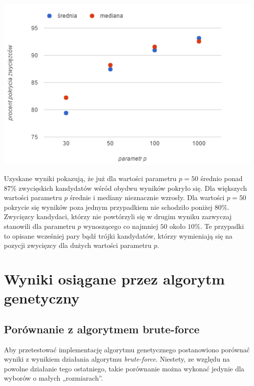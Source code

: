 \documentclass[pdflatex,11pt]{../aghdoc_version2}
\begin{document}
\vspace{\baselineskip}

\begin{center}
\centerline{\includegraphics[scale=1]{pics/srednia_mediana_od_parametr_p.png}}
\end{center}

Uzyskane wyniki pokazują, że już dla wartości parametru $p = 50$ średnio ponad $87 \%$ zwycięskich kandydatów wśród obydwu wyników pokryło się. Dla większych wartości parametru $p$ średnie i mediany nieznacznie wzrosły. Dla wartości $p = 50$ pokrycie się wyników poza jednym przypadkiem nie schodziło poniżej $80 \%$. Zwycięzcy kandydaci, którzy nie powtórzyli się w drugim wyniku zazwyczaj stanowili dla parametru $p$ wynoszącego co najmniej $50$ około $10 \%$. Te przypadki to opisane wcześniej pary bądź trójki kandydatów, którzy wymieniają się na pozycji zwycięzcy dla dużych wartości parametru $p$. 


\section{Wyniki osiągane przez algorytm genetyczny}

\subsection{Porównanie z algorytmem brute-force}

Aby przetestować implementację algorytmu genetycznego postanowiono porównać wyniki z wynikiem działania algorytmu \textit{brute-force}. Niestety, ze względu na powolne działanie tego ostatniego, takie porównanie można wykonać jedynie dla wyborów o małych „rozmiarach”.
\end{document}
